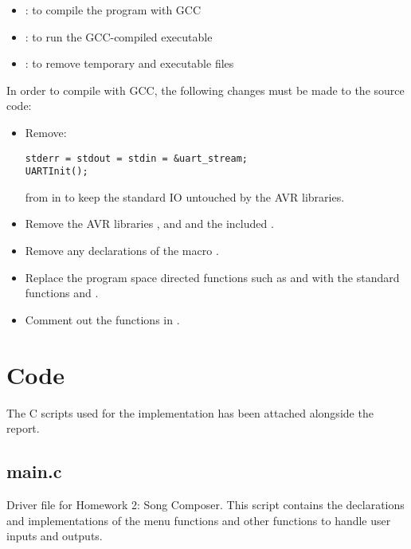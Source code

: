 \documentclass[usletter, 12pt]{article}
\begin{document}
    \begin{itemize}

        \item {}: to compile the program with GCC

        \item {}: to run the GCC-compiled executable

        \item {}: to remove temporary and executable files 

    \end{itemize}

    \noindent In order to compile with GCC, the following changes must be made to the source code:

    \begin{itemize}

        \item Remove:
\begin{lstlisting}
stderr = stdout = stdin = &uart_stream;
UARTInit();
\end{lstlisting}
        from  in  to keep the standard IO untouched by the AVR libraries.

        \item Remove the AVR libraries ,  and  and the included .

        \item Remove any declarations of the macro .

        \item Replace the program space directed functions such as  and  with the standard functions  and .

        \item Comment out the  functions in .

    \end{itemize}

    \section{Code}
    The C scripts used for the implementation has been attached alongside the report.

        \subsection{main.c}
        Driver file for Homework 2: Song Composer. This script contains the declarations and implementations of the menu functions and other functions to handle user inputs and outputs.
\end{document}
